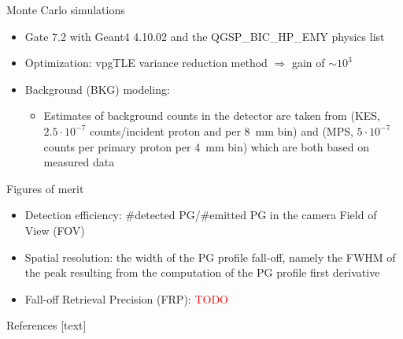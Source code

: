 \documentclass[final]{beamer} %
\newcommand{\tcr}[1]{\textcolor{red}{#1}}
\begin{document}
\begin{frame}{}
\begin{columns}[t]
\begin{column}{0.49\textwidth}
	  \begin{block}{Monte Carlo simulations}
			
			\begin{itemize}
				\item Gate 7.2 with Geant4 4.10.02 and the QGSP\_BIC\_HP\_EMY physics list
				\item Optimization: vpgTLE variance reduction method $\Rightarrow$ gain of $\sim 10^3$ \cite{Huisman2016}
				\item Background (BKG) modeling: 
				\begin{itemize}
					\item Estimates of background counts in the detector are taken from \cite{Perali2014} (KES, $2.5\cdot10^{-7}$ counts/incident proton and per 8~mm bin) and \cite{Pinto2014} (MPS, $5 \cdot 10^{-7}$ counts per primary proton per 4~mm bin) which are both based on measured data

				\end{itemize}

			\end{itemize}

	  \end{block}		
		
	  \begin{block}{Figures of merit}
			
			\begin{itemize}
				\item Detection efficiency: \#detected PG/\#emitted PG in the camera Field of View (FOV)
				\item Spatial resolution: the width of the PG profile fall-off, namely the FWHM of the peak resulting from the computation of the PG profile first derivative
				\item Fall-off Retrieval Precision (FRP): \tcr{TODO}
			\end{itemize}


	  \end{block}				
		
	  \begin{block}{References}
	    \tiny
	    [text] 
%	    
	    
	    				


	  \end{block}
       

\end{column}
\end{columns}
\end{frame}
\end{document}
